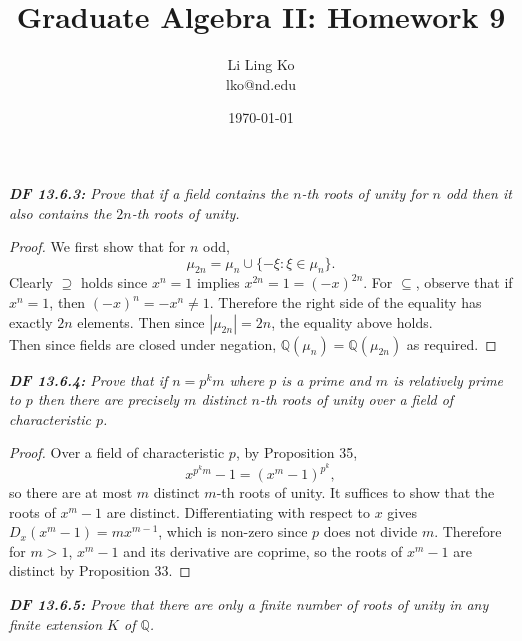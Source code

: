 \documentclass{article}
\begin{document}
\title{Graduate Algebra II: Homework 9}
\author{Li Ling Ko\\ lko@nd.edu}
\date{\today}
\maketitle

\it \textbf{DF 13.6.3:} Prove that if a field contains the $n$-th roots of
  unity for $n$ odd then it also contains the $2n$-th roots of unity.

  \begin{proof}
    We first show that for $n$ odd,
    \[\mu_{2n} =\mu_n \cup \{-\xi:\xi\in\mu_n\}.\]
    Clearly $\supseteq$ holds since $x^n=1$ implies $x^{2n}=1=(-x)^{2n}$.
    For $\subseteq$, observe that if $x^n=1$, then $(-x)^n=-x^n\neq1$.
    Therefore the right side of the equality has exactly $2n$ elements.
    Then since $|\mu_{2n}|=2n$, the equality above holds. \\

    Then since fields are closed under negation,
    $\mathbb{Q}(\mu_n)=\mathbb{Q}(\mu_{2n})$ as required.
  \end{proof}

\it \textbf{DF 13.6.4:} Prove that if $n=p^km$ where $p$ is a prime and $m$
  is relatively prime to $p$ then there are precisely $m$ distinct $n$-th
  roots of unity over a field of characteristic $p$.

  \begin{proof}
    Over a field of characteristic $p$, by Proposition 35,
    \[x^{p^km}-1 =(x^m-1)^{p^k},\]
    so there are at most $m$ distinct $m$-th roots of unity. It suffices to
    show that the roots of $x^m-1$ are distinct. Differentiating with
    respect to $x$ gives $D_x(x^m-1)=mx^{m-1}$, which is non-zero since $p$
    does not divide $m$. Therefore for $m>1$, $x^m-1$ and its derivative
    are coprime, so the roots of $x^m-1$ are distinct by Proposition 33.
  \end{proof}

\it \textbf{DF 13.6.5:} Prove that there are only a finite number of roots
  of unity in any finite extension $K$ of $\mathbb{Q}$.
\end{document}
